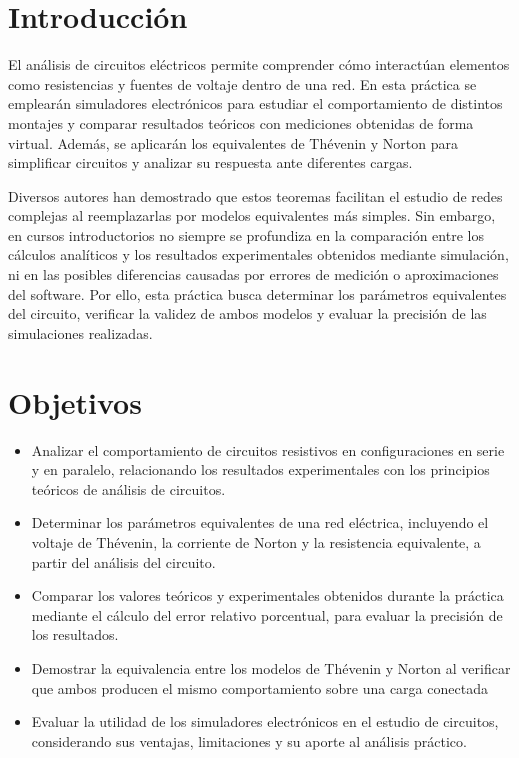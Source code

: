 \documentclass{article}
\begin{document}
    \section{Introducción}

    El análisis de circuitos eléctricos permite comprender cómo interactúan elementos como resistencias y fuentes de voltaje dentro de una red. En esta práctica se emplearán simuladores electrónicos para estudiar el comportamiento de distintos montajes y comparar resultados teóricos con mediciones obtenidas de forma virtual. Además, se aplicarán los equivalentes de Thévenin y Norton para simplificar circuitos y analizar su respuesta ante diferentes cargas.

    Diversos autores han demostrado que estos teoremas facilitan el estudio de redes complejas al reemplazarlas por modelos equivalentes más simples. Sin embargo, en cursos introductorios no siempre se profundiza en la comparación entre los cálculos analíticos y los resultados experimentales obtenidos mediante simulación, ni en las posibles diferencias causadas por errores de medición o aproximaciones del software. Por ello, esta práctica busca determinar los parámetros equivalentes del circuito, verificar la validez de ambos modelos y evaluar la precisión de las simulaciones realizadas.

    \section{Objetivos}

    \begin{itemize}
        \item Analizar el comportamiento de circuitos resistivos en configuraciones en serie y en paralelo, relacionando los resultados experimentales con los principios teóricos de análisis de circuitos.
        \item Determinar los parámetros equivalentes de una red eléctrica, incluyendo el voltaje de Thévenin, la corriente de Norton y la resistencia equivalente, a partir del análisis del circuito.
        \item Comparar los valores teóricos y experimentales obtenidos durante la práctica mediante el cálculo del error relativo porcentual, para evaluar la precisión de los resultados.
        \item Demostrar la equivalencia entre los modelos de Thévenin y Norton al verificar que ambos producen el mismo comportamiento sobre una carga conectada
        \item Evaluar la utilidad de los simuladores electrónicos en el estudio de circuitos, considerando sus ventajas, limitaciones y su aporte al análisis práctico.
    \end{itemize}
\end{document}
